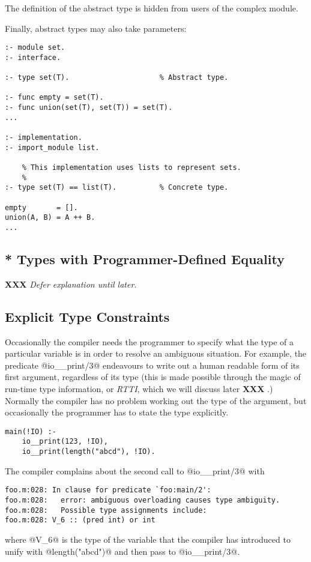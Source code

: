 \documentclass[a4paper,11pt,notitlepage,onecolumn]{article}
\newcommand{\XXX}[1]%
{{\small\textbf{XXX} \emph{#1}}}
\begin{document}
The definition of the abstract type is hidden from users of
the complex module.

Finally, abstract types may also take parameters:
\begin{verbatim}
:- module set.
:- interface.

:- type set(T).                     % Abstract type.

:- func empty = set(T).
:- func union(set(T), set(T)) = set(T).
...

:- implementation.
:- import_module list.

    % This implementation uses lists to represent sets.
    %
:- type set(T) == list(T).          % Concrete type.

empty       = [].
union(A, B) = A ++ B.
...
\end{verbatim}

\subsection{* Types with Programmer-Defined Equality}

\XXX{Defer explanation until later.}

\subsection{Explicit Type Constraints}

Occasionally the compiler needs the programmer to specify what the type
of a particular variable is in order to resolve an ambiguous situation.
For example, the predicate @io__print/3@ endeavours to write out a human
readable form of its first argument, regardless of its type (this is
made possible through the magic of run-time type information, or
\emph{RTTI}, which we will discuss later \XXX{}.) Normally the compiler
has no problem working out the type of the argument, but occasionally
the programmer has to state the type explicitly.
\begin{verbatim}
main(!IO) :-
    io__print(123, !IO),
    io__print(length("abcd"), !IO).
\end{verbatim}
The compiler complains about the second call to @io__print/3@
with
\begin{verbatim}
foo.m:028: In clause for predicate `foo:main/2':
foo.m:028:   error: ambiguous overloading causes type ambiguity.
foo.m:028:   Possible type assignments include:
foo.m:028: V_6 :: (pred int) or int
\end{verbatim}
where @V_6@ is the type of the variable that the compiler has
introduced to unify with @length("abcd")@ and then pass to
@io__print/3@.
\end{document}
